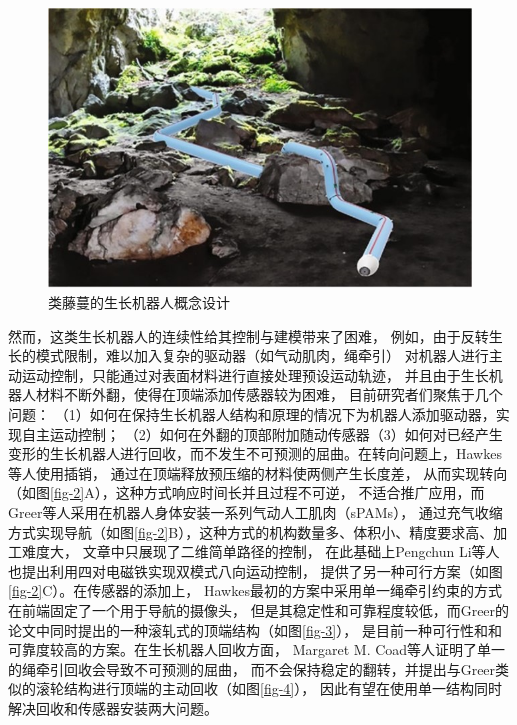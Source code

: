 \documentclass[11pt, a4paper, oneside]{ctexart}
\begin{document}
\begin{figure}[h]
    \centering
    \includegraphics{fig1}
    \caption{类藤蔓的生长机器人概念设计}
    \label{fig-1}
\end{figure}

然而，这类生长机器人的连续性给其控制与建模带来了困难，
例如，由于反转生长的模式限制，难以加入复杂的驱动器（如气动肌肉，绳牵引）
对机器人进行主动运动控制，只能通过对表面材料进行直接处理预设运动轨迹，
并且由于生长机器人材料不断外翻，使得在顶端添加传感器较为困难，
目前研究者们聚焦于几个问题：
（1）如何在保持生长机器人结构和原理的情况下为机器人添加驱动器，实现自主运动控制；
（2）如何在外翻的顶部附加随动传感器（3）如何对已经产生变形的生长机器人进行回收，而不发生不可预测的屈曲。在转向问题上，Hawkes等人使用插销\cite{hawkesSoftRobotThat2017a}，
通过在顶端释放预压缩的材料使两侧产生长度差，
从而实现转向（如图\ref{fig-2}A），这种方式响应时间长并且过程不可逆，
不适合推广应用，而Greer等人采用在机器人身体安装一系列气动人工肌肉（sPAMs）\cite{kublerMultiSegmentSoftGrowing2023}，
通过充气收缩方式实现导航（如图\ref{fig-2}B），这种方式的机构数量多、体积小、精度要求高、加工难度大，
文章中只展现了二维简单路径的控制，
在此基础上Pengchun Li等人也提出利用四对电磁铁实现双模式八向运动控制，
提供了另一种可行方案（如图\ref{fig-2}C）。在传感器的添加上，
Hawkes最初的方案中采用单一绳牵引约束的方式在前端固定了一个用于导航的摄像头，
但是其稳定性和可靠程度较低，而Greer的论文中同时提出的一种滚轧式的顶端结构（如图\ref{fig-3}），
是目前一种可行性和和可靠度较高的方案。在生长机器人回收方面，
Margaret M. Coad等人证明了单一的绳牵引回收会导致不可预测的屈曲，
而不会保持稳定的翻转，并提出与Greer类似的滚轮结构进行顶端的主动回收（如图\ref{fig-4}），
因此有望在使用单一结构同时解决回收和传感器安装两大问题。
\end{document}
